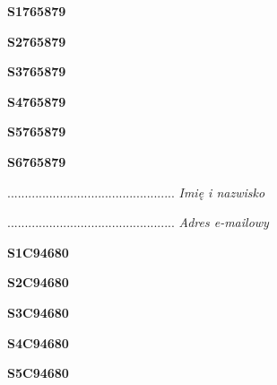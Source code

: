 \begin{turn}{90}\huge \textbf{S1765879}\end{turn}

\begin{turn}{90}\huge \textbf{S2765879}\end{turn}

\begin{turn}{90}\huge \textbf{S3765879}\end{turn}

\begin{turn}{90}\huge \textbf{S4765879}\end{turn}

\begin{turn}{90}\huge \textbf{S5765879}\end{turn}

\begin{turn}{90}\huge \textbf{S6765879}\end{turn}

\begin{turn}{90}\begin{minipage}{\linewidth} \vspace{20mm} ................................................  \textit{Imię i nazwisko}\end{minipage}\end{turn}

\begin{turn}{90}\begin{minipage}{\linewidth} \vspace{20mm} ................................................  \textit{Adres e-mailowy}\end{minipage}\end{turn}

\begin{turn}{90}\huge \textbf{S1C94680}\end{turn}

\begin{turn}{90}\huge \textbf{S2C94680}\end{turn}

\begin{turn}{90}\huge \textbf{S3C94680}\end{turn}

\begin{turn}{90}\huge \textbf{S4C94680}\end{turn}

\begin{turn}{90}\huge \textbf{S5C94680}\end{turn}

